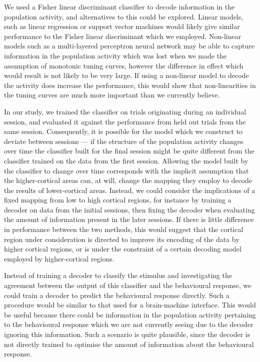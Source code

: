 We used a Fisher linear discriminant classifier to decode information in the population activity, and alternatives to this could be explored.
Linear models, such as linear regression or support vector machines would likely give similar performance to the Fisher linear discriminant which we employed.
Non-linear models such as a multi-layered perceptron neural network may be able to capture information in the population activity which was lost when we made the assumption of monotonic tuning curves, however the difference in effect which would result is not likely to be very large.
If using a non-linear model to decode the activity does increase the performance, this would show that non-linearities in the tuning curves are much more important than we currently believe.

In our study, we trained the classifier on trials originating during an individual session, and evaluated it against the performance from held out trials from the same session.
Consequently, it is possible for the model which we construct to deviate between sessions --- if the structure of the population activity changes over time the classifier built for the final session might be quite different from the classifier trained on the data from the first session.
Allowing the model built by the classifier to change over time corresponds with the implicit assumption that the higher-cortical areas can, at will, change the mapping they employ to decode the results of lower-cortical areas.
Instead, we could consider the implications of a fixed mapping from low to high cortical regions, for instance by training a decoder on data from the initial sessions, then fixing the decoder when evaluating the amount of information present in the later sessions.
If there is little difference in performance between the two methods, this would suggest that the cortical region under consideration is directed to improve its encoding of the data by higher cortical regions, or is under the constraint of a certain decoding model employed by higher-cortical regions.

Instead of training a decoder to classify the stimulus and investigating the agreement between the output of this classifier and the behavioural response, we could train a decoder to predict the behavioural response directly.
Such a procedure would be similar to that used for a brain-machine interface.
This would be useful because there could be information in the population activity pertaining to the behavioural response which we are not currently seeing due to the decoder ignoring this information.
Such a scenario is quite plausible, since the decoder is not directly trained to optimise the amount of information about the behavioural response.

